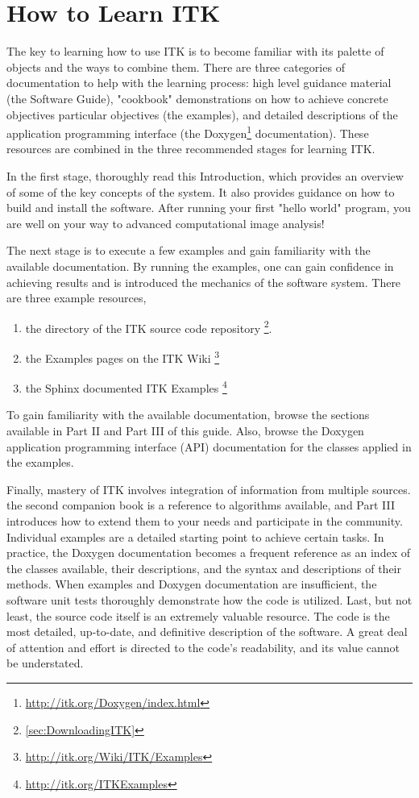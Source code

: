\section{How to Learn ITK}
\label{sec:HowToLearnITK}

The key to learning how to use ITK is to become familiar with its palette of
objects and the ways to combine them. There are three categories of
documentation to help with the learning process: high level guidance material
(the Software Guide), "cookbook" demonstrations on how to achieve concrete objectives
particular objectives (the examples), and detailed descriptions of the
application programming interface (the
Doxygen\footnote{\url{http://itk.org/Doxygen/index.html}} documentation). These
resources are combined in the three recommended stages for learning ITK.

In the first stage, thoroughly read this Introduction, which provides an
overview of some of the key concepts of the system. It also provides guidance
on how to build and install the software. After running your first "hello
world" program, you are well on your way to advanced computational image
analysis!

The next stage is to execute a few examples and gain familiarity with the
available documentation.  By running the examples, one can gain confidence
in achieving results and is introduced the mechanics of the software system.
There are three example resources,
\begin{enumerate}
  \item	the  directory of the ITK source code repository \footnote{\ref{sec:DownloadingITK}}.
  \item the Examples pages on the ITK Wiki \footnote{\url{http://itk.org/Wiki/ITK/Examples}}
  \item	the Sphinx documented ITK Examples \footnote{\url{http://itk.org/ITKExamples}}
\end{enumerate}
To gain familiarity with the available documentation, browse the sections
available in Part II and Part III of this guide. Also, browse the Doxygen
application programming interface (API) documentation for the classes applied
in the examples.

Finally, mastery of ITK involves integration of information from multiple
sources. the second companion book is a reference to algorithms available, and
Part III introduces how to extend them to your needs and participate in the
community. Individual examples are a detailed starting point to achieve
certain tasks.  In practice, the Doxygen documentation becomes a frequent
reference as an index of the classes available, their descriptions, and the
syntax and descriptions of their methods.  When examples and Doxygen
documentation are insufficient, the software unit tests thoroughly demonstrate
how the code is utilized. Last, but not least, the source code itself
is an extremely valuable resource. The code is the most detailed, up-to-date, and
definitive description of the software. A great deal of attention and effort
is directed to the code's readability, and its value cannot be understated.

